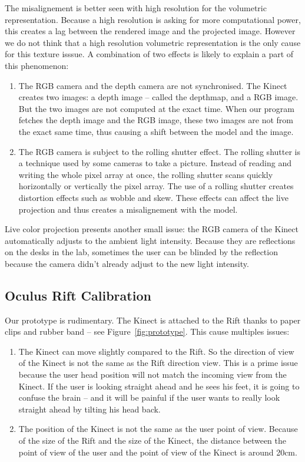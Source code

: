 \documentclass[12pt]{article}
\begin{document}
The misalignement is better seen with high resolution for the volumetric representation. Because a high resolution is asking for more computational power, this creates a lag between the rendered image and the projected image. However we do not think that a high resolution volumetric representation is the only cause for this texture isssue. A combination of two effects is likely to explain a part of this phenomenon:
\begin{enumerate}
\item The RGB camera and the depth camera are not synchronised. The Kinect creates two images: a depth image -- called the depthmap, and a RGB image. But the two images are not computed at the exact time. When our program fetches the depth image and the RGB image, these two images are not from the exact same time, thus causing a shift between the model and the image.
\item The RGB camera is subject to the rolling shutter effect. The rolling shutter is a technique used by some cameras to take a picture. Instead of reading and writing the whole pixel array at once, the rolling shutter scans quickly horizontally or vertically the pixel array. The use of a rolling shutter creates distortion effects such as wobble and skew. These effects can affect the live projection and thus creates a misalignement with the model.
\end{enumerate}

Live color projection presents another small issue: the RGB camera of the Kinect automatically adjusts to the ambient light intensity. Because they are reflections on the desks in the lab, sometimes the user can be blinded by the reflection because the camera didn't already adjust to the new light intensity.

\subsection{Oculus Rift Calibration}

Our prototype is rudimentary. The Kinect is attached to the Rift thanks to paper clips and rubber band -- see Figure~\ref{fig:prototype}. This cause multiples issues:
\begin{enumerate}
\item The Kinect can move slightly compared to the Rift. So the direction of view of the Kinect is not the same as the Rift direction view. This is a prime issue because the user head position will not match the incoming view from the Kinect. If the user is looking straight ahead and he sees his feet, it is going to confuse the brain -- and it will be painful if the user wants to really look straight ahead by tilting his head back.
\item The position of the Kinect is not the same as the user point of view. Because of the size of the Rift and the size of the Kinect, the distance between the point of view of the user and the point of view of the Kinect is around 20cm.
\end{enumerate}
\end{document}
